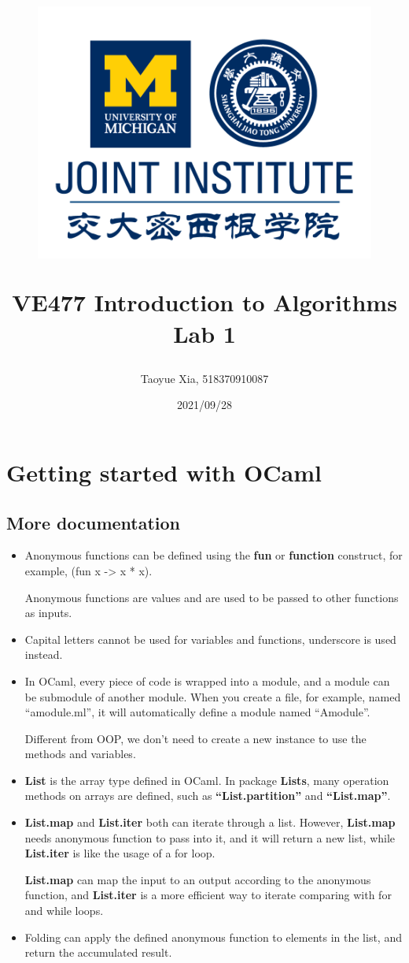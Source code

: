 \documentclass[12pt, a4paper]{article}
\title{
    \begin{figure}[H]
        \centering
        \includegraphics{AAA.png}
    \end{figure}
    VE477 Introduction to Algorithms\\ 
    Lab 1}
\author{Taoyue Xia, 518370910087}
\date{2021/09/28}
\begin{document}
\maketitle

\newpage
\setcounter{section}{1}
\section{Getting started with OCaml}
\subsection{More documentation}
\begin{itemize}
    \item Anonymous functions can be defined using the \textbf{fun} or \textbf{function} construct, 
          for example, (fun x -> x * x).

          Anonymous functions are values and are used to be passed to other functions as inputs.
    
    \item Capital letters cannot be used for variables and functions, underscore is used instead.
    
    \item In OCaml, every piece of code is wrapped into a module, and a module can be submodule of another module. 
          When you create a file, for example, named ``amodule.ml'', it will automatically define a module named ``Amodule''.

          Different from OOP, we don't need to create a new instance to use the methods and variables.

    \item \textbf{List} is the array type defined in OCaml. In package \textbf{Lists}, many operation methods on arrays are defined, 
          such as \textbf{``List.partition''} and \textbf{``List.map''}.

    \item \textbf{List.map} and \textbf{List.iter} both can iterate through a list. However, 
          \textbf{List.map} needs anonymous function to pass into it, and it will return a new list, 
          while \textbf{List.iter} is like the usage of a for loop.

          \textbf{List.map} can map the input to an output according to the anonymous function, 
          and \textbf{List.iter} is a more efficient way to iterate comparing with for and while loops.

    \item Folding can apply the defined anonymous function to elements in the list, and return the accumulated result.
          

\end{itemize}
\end{document}
